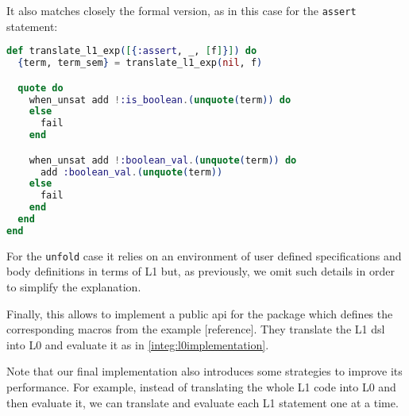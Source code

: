 It also matches closely the formal version, as in this case for the 
\verb|assert| statement:

\begin{lstlisting}[language=elixir,numbers=none,frame=none]
def translate_l1_exp([{:assert, _, [f]}]) do
  {term, term_sem} = translate_l1_exp(nil, f)

  quote do
    when_unsat add !:is_boolean.(unquote(term)) do
    else
      fail
    end

    when_unsat add !:boolean_val.(unquote(term)) do
      add :boolean_val.(unquote(term))
    else
      fail
    end
  end
end
\end{lstlisting}

For the \verb|unfold| case it relies on an environment of user defined specifications
and body definitions in terms of L1 but, as previously, we omit such details in order 
to simplify the explanation.

Finally, this allows to implement a public \gls{api} for the package which defines 
the corresponding macros from the example [reference]. They translate the L1 \gls{dsl} 
into L0 and evaluate it as in \ref{integ:l0implementation}.

Note that our final implementation also introduces some strategies to improve its 
performance. For example, instead of translating the whole L1 code into L0 and then 
evaluate it, we can translate and evaluate each L1 statement one at a time.
